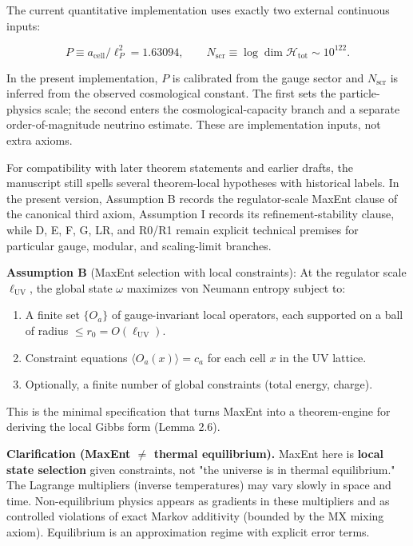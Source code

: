 The current quantitative implementation uses exactly two external continuous inputs:

\[
P \equiv a_{\mathrm{cell}}/\ell_P^2 = 1.63094,
\qquad
N_{\mathrm{scr}} \equiv \log \dim \mathcal H_{\mathrm{tot}} \sim 10^{122}.
\]

In the present implementation, \(P\) is calibrated from the gauge sector and \(N_{\mathrm{scr}}\) is inferred from the observed cosmological constant. The first sets the particle-physics scale; the second enters the cosmological-capacity branch and a separate order-of-magnitude neutrino estimate. These are implementation inputs, not extra axioms.

For compatibility with later theorem statements and earlier drafts, the manuscript still spells several theorem-local hypotheses with historical labels. In the present version, Assumption B records the regulator-scale MaxEnt clause of the canonical third axiom, Assumption I records its refinement-stability clause, while D, E, F, G, LR, and R0/R1 remain explicit technical premises for particular gauge, modular, and scaling-limit branches.

\textbf{Assumption B} (MaxEnt selection with local constraints): At the regulator scale \(\ell_{\mathrm{UV}}\), the global state \(\omega\) maximizes von Neumann entropy subject to:

\begin{enumerate}
\def\labelenumi{\arabic{enumi}.}
\tightlist
\item
  A finite set \(\{O_a\}\) of gauge-invariant local operators, each supported on a ball of radius \(\le r_0 = O(\ell_{\mathrm{UV}})\).
\item
  Constraint equations \(\langle O_a(x) \rangle = c_a\) for each cell \(x\) in the UV lattice.
\item
  Optionally, a finite number of global constraints (total energy, charge).
\end{enumerate}

This is the minimal specification that turns MaxEnt into a theorem-engine for deriving the local Gibbs form (Lemma 2.6).

\textbf{Clarification (MaxEnt \(\neq\) thermal equilibrium).} MaxEnt here is \textbf{local state selection} given constraints, not "the universe is in thermal equilibrium." The Lagrange multipliers (inverse temperatures) may vary slowly in space and time. Non-equilibrium physics appears as gradients in these multipliers and as controlled violations of exact Markov additivity (bounded by the MX mixing axiom). Equilibrium is an approximation regime with explicit error terms.

